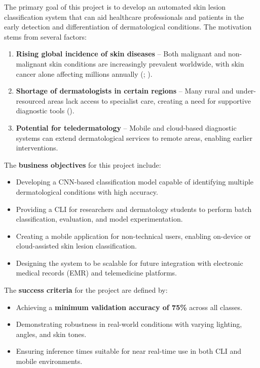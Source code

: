 \documentclass[
  12pt,
  oneside]{article}
\providecommand{\tightlist}{%
  \setlength{\itemsep}{0pt}\setlength{\parskip}{0pt}}
\begin{document}
The primary goal of this project is to develop an automated skin lesion
classification system that can aid healthcare professionals and patients
in the early detection and differentiation of dermatological conditions.
The motivation stems from several factors:

\begin{enumerate}
\def\labelenumi{\arabic{enumi}.}
\tightlist
\item
  \textbf{Rising global incidence of skin diseases} -- Both malignant
  and non-malignant skin conditions are increasingly prevalent
  worldwide, with skin cancer alone affecting millions annually
  (;
  ).
\item
  \textbf{Shortage of dermatologists in certain regions} -- Many rural
  and under-resourced areas lack access to specialist care, creating a
  need for supportive diagnostic tools
  ().
\item
  \textbf{Potential for teledermatology} -- Mobile and cloud-based
  diagnostic systems can extend dermatological services to remote areas,
  enabling earlier interventions.
\end{enumerate}

The \textbf{business objectives} for this project include:

\begin{itemize}
\tightlist
\item
  Developing a CNN-based classification model capable of identifying
  multiple dermatological conditions with high accuracy.
\item
  Providing a CLI for researchers and dermatology students to perform
  batch classification, evaluation, and model experimentation.
\item
  Creating a mobile application for non-technical users, enabling
  on-device or cloud-assisted skin lesion classification.
\item
  Designing the system to be scalable for future integration with
  electronic medical records (EMR) and telemedicine platforms.
\end{itemize}

The \textbf{success criteria} for the project are defined by:

\begin{itemize}
\tightlist
\item
  Achieving a \textbf{minimum validation accuracy of 75\%} across all
  classes.
\item
  Demonstrating robustness in real-world conditions with varying
  lighting, angles, and skin tones.
\item
  Ensuring inference times suitable for near real-time use in both CLI
  and mobile environments.
\end{itemize}
\end{document}
